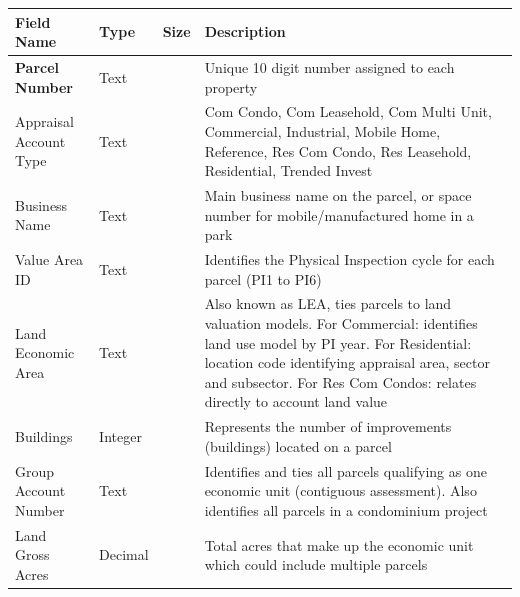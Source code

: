 \documentclass[
  english,
  letterpaper,
  DIV=11,
  numbers=noendperiod]{scrreprt}
\newcounter{none} %
\begin{document}
{\def\LTcaptype{none} %
\begin{longtable}[]{@{}
  >{\raggedright\arraybackslash}p{}
  >{\raggedright\arraybackslash}p{}
  >{\raggedright\arraybackslash}p{}
  >{\raggedright\arraybackslash}p{}@{}}
\toprule\noalign{}
\begin{minipage}[b]{\linewidth}\raggedright
Field Name
\end{minipage} & \begin{minipage}[b]{\linewidth}\raggedright
Type
\end{minipage} & \begin{minipage}[b]{\linewidth}\raggedright
Size
\end{minipage} & \begin{minipage}[b]{\linewidth}\raggedright
Description
\end{minipage} \\
\midrule\noalign{}
\endhead
\bottomrule\noalign{}
\endlastfoot
\textbf{Parcel Number} & Text & 10 & Unique 10 digit number assigned to
each property \\
Appraisal Account Type & Text & 15 & Com Condo, Com Leasehold, Com Multi
Unit, Commercial, Industrial, Mobile Home, Reference, Res Com Condo, Res
Leasehold, Residential, Trended Invest \\
Business Name & Text & 50 & Main business name on the parcel, or space
number for mobile/manufactured home in a park \\
Value Area ID & Text & 10 & Identifies the Physical Inspection cycle for
each parcel (PI1 to PI6) \\
Land Economic Area & Text & 30 & Also known as LEA, ties parcels to land
valuation models. For Commercial: identifies land use model by PI year.
For Residential: location code identifying appraisal area, sector and
subsector. For Res Com Condos: relates directly to account land value \\
Buildings & Integer & & Represents the number of improvements
(buildings) located on a parcel \\
Group Account Number & Text & 30 & Identifies and ties all parcels
qualifying as one economic unit (contiguous assessment). Also identifies
all parcels in a condominium project \\
Land Gross Acres & Decimal & 15.4 & Total acres that make up the
economic unit which could include multiple parcels \\

\end{longtable}}
\end{document}
